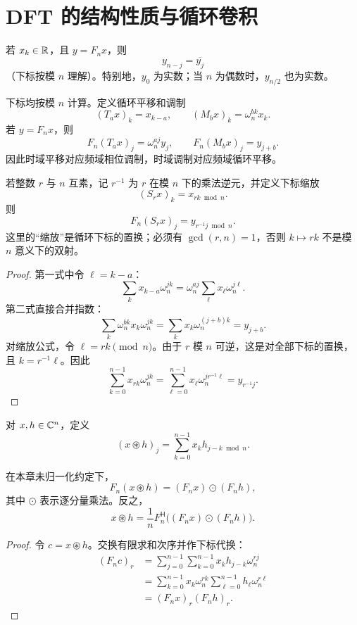 \section{DFT 的结构性质与循环卷积}

\begin{proposition}[实序列的共轭对称性]
若 $x_k\in\mathbb{R}$，且 $y=F_nx$，则
\[
y_{n-j}=\overline{y_j}
\]
（下标按模 $n$ 理解）。特别地，$y_0$ 为实数；当 $n$ 为偶数时，$y_{n/2}$ 也为实数。
\end{proposition}

\begin{proposition}
下标均按模 $n$ 计算。定义循环平移和调制
\[
(T_ax)_k=x_{k-a},
\qquad
(M_bx)_k=\omega_n^{bk}x_k.
\]
若 $y=F_nx$，则
\[
F_n(T_ax)_j=\omega_n^{aj}y_j,
\qquad
F_n(M_bx)_j=y_{j+b}.
\]
因此时域平移对应频域相位调制，时域调制对应频域循环平移。

若整数 $r$ 与 $n$ 互素，记 $r^{-1}$ 为 $r$ 在模 $n$ 下的乘法逆元，并定义下标缩放
\[
(S_rx)_k=x_{rk\bmod n}.
\]
则
\[
F_n(S_rx)_j=y_{r^{-1}j\bmod n}.
\]
这里的“缩放”是循环下标的置换；必须有 $\gcd(r,n)=1$，否则 $k\mapsto rk$ 不是模 $n$ 意义下的双射。
\end{proposition}
\begin{proof}
第一式中令 $\ell=k-a$：
\[
\sum_kx_{k-a}\omega_n^{jk}
=\omega_n^{aj}\sum_\ell x_\ell\omega_n^{j\ell}.
\]
第二式直接合并指数：
\[
\sum_k\omega_n^{bk}x_k\omega_n^{jk}
=\sum_kx_k\omega_n^{(j+b)k}=y_{j+b}.
\]
对缩放公式，令 $\ell=rk\pmod n$。由于 $r$ 模 $n$ 可逆，这是对全部下标的置换，且 $k=r^{-1}\ell$。因此
\[
\sum_{k=0}^{n-1}x_{rk}\omega_n^{jk}
=\sum_{\ell=0}^{n-1}x_\ell\omega_n^{j r^{-1}\ell}
=y_{r^{-1}j}.
\]
\end{proof}

\begin{definition}[循环卷积]
对 $x,h\in\mathbb{C}^n$，定义
\[
(x\mathbin{\circledast}h)_j
=\sum_{k=0}^{n-1}x_kh_{j-k\bmod n}.
\]
\end{definition}

\begin{theorem}[循环卷积定理]
在本章未归一化约定下，
\[
F_n(x\mathbin{\circledast}h)
=(F_nx)\odot(F_nh),
\]
其中 $\odot$ 表示逐分量乘法。反之，
\[
x\mathbin{\circledast}h
=\frac1nF_n^{\mathsf H}\bigl((F_nx)\odot(F_nh)\bigr).
\]
\end{theorem}
\begin{proof}
令 $c=x\mathbin{\circledast}h$。交换有限求和次序并作下标代换：
\begin{align*}
(F_nc)_r
&=\sum_{j=0}^{n-1}\sum_{k=0}^{n-1}x_kh_{j-k}\omega_n^{rj}\\
&=\sum_{k=0}^{n-1}x_k\omega_n^{rk}
\sum_{\ell=0}^{n-1}h_\ell\omega_n^{r\ell}\\
&=(F_nx)_r(F_nh)_r.
\end{align*}
\end{proof}

